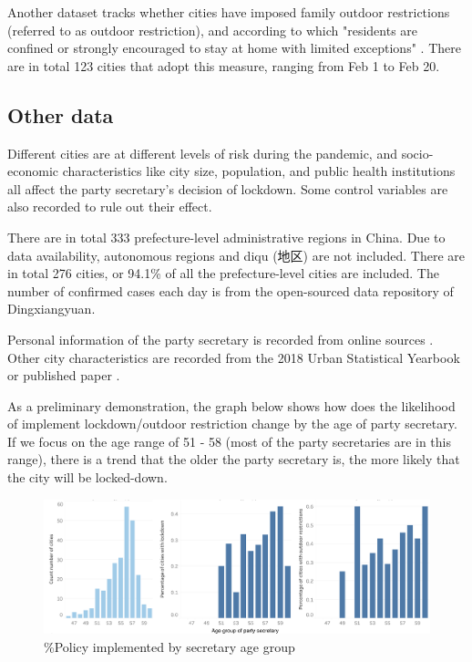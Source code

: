 \documentclass{article}
\begin{document}
\begin{CJK}{UTF8}{gbsn}
Another dataset tracks whether cities have imposed family outdoor restrictions (referred to as outdoor restriction), and according to which "residents are confined or strongly encouraged to stay at home with limited exceptions" \cite{xichen}. There are in total 123 cities that adopt this measure, ranging from Feb 1 to Feb 20. 

\subsection{Other data} 
Different cities are at different levels of risk during the pandemic, and socio-economic characteristics like city size, population, and public health institutions all affect the party secretary's decision of lockdown. Some control variables are also recorded to rule out their effect.

There are in total 333 prefecture-level administrative regions in China. Due to data availability, autonomous regions and diqu (地区) are not included. There are in total 276 cities, or 94.1\% of all the prefecture-level cities are included. The number of confirmed cases each day is from the open-sourced data repository of Dingxiangyuan. 

Personal information of the party secretary is recorded from online sources \cite{wiki, official info}. Other city characteristics are recorded from the 2018 Urban Statistical Yearbook or published paper \cite{xichen}.

As a preliminary demonstration, the graph below shows how does the likelihood of implement lockdown/outdoor restriction change by the age of party secretary. If we focus on the age range of 51 - 58 (most of the party secretaries are in this range), there is a trend that the older the party secretary is, the more likely that the city will be locked-down.


\begin{figure}[H] %
\centering %
\includegraphics[width=1\textwidth]{graphs/age_group_avg} %
\caption{\%Policy implemented by secretary age group} %
\label{fig.1} %
\end{figure}



\end{CJK}
\end{document}
